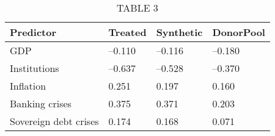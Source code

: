 \documentclass{article}
\begin{document}
\begin{table}[tbp] \centering
{}

\caption{TABLE 3}
\begin{tabularx}{\linewidth}{lCCC}

\toprule
{Predictor}&{Treated}&{Synthetic}&{DonorPool} \tabularnewline
\midrule \addlinespace[\belowrulesep]
GDP&--0.110&--0.116&--0.180 \tabularnewline
Institutions&--0.637&--0.528&--0.370 \tabularnewline
Inflation&0.251&0.197&0.160 \tabularnewline
Banking crises&0.375&0.371&0.203 \tabularnewline
Sovereign debt crises&0.174&0.168&0.071 \tabularnewline
\bottomrule 

\end{tabularx}
\end{table}
\end{document}

